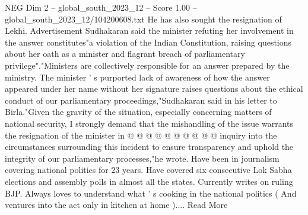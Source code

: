 \begin{textsample}{NEG Dim 2 – global\_south\_2023\_12 – Score 1.00 – global\_south\_2023\_12/104200608.txt}
He has also sought the resignation of Lekhi.
Advertisement Sudhakaran said the minister refuting her involvement in the answer constitutes"a violation of the Indian Constitution, raising questions about her oath as a minister and flagrant breach of parliamentary privilege"."Ministers are collectively responsible for an answer prepared by the ministry.
The minister ' s purported lack of awareness of how the answer appeared under her name without her signature raises questions about the ethical conduct of our parliamentary proceedings,"Sudhakaran said in his letter to Birla."Given the gravity of the situation, especially concerning matters of national security, I strongly demand that the mishandling of the issue warrants the resignation of the minister in @ @ @ @ @ @ @ @ @ @ inquiry into the circumstances surrounding this incident to ensure transparency and uphold the integrity of our parliamentary processes,"he wrote.
Have been in journalism covering national politics for 23 years.
Have covered six consecutive Lok Sabha elections and assembly polls in almost all the states.
Currently writes on ruling BJP.
Always loves to understand what ' s cooking in the national politics ( And ventures into the act only in kitchen at home )....
Read More

\end{textsample}
